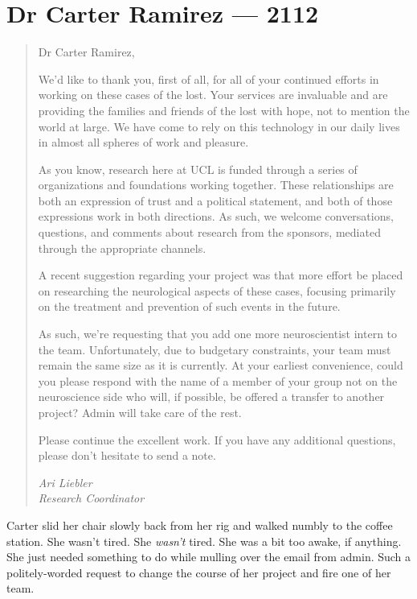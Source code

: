\hypertarget{dr-carter-ramirez-2112}{%
\chapter*{Dr Carter Ramirez — 2112}\label{dr-carter-ramirez-2112}}

\begin{quote}
Dr Carter Ramirez,

We'd like to thank you, first of all, for all of your continued efforts in working on these cases of the lost. Your services are invaluable and are providing the families and friends of the lost with hope, not to mention the world at large. We have come to rely on this technology in our daily lives in almost all spheres of work and pleasure.

As you know, research here at UCL is funded through a series of organizations and foundations working together. These relationships are both an expression of trust and a political statement, and both of those expressions work in both directions. As such, we welcome conversations, questions, and comments about research from the sponsors, mediated through the appropriate channels.

A recent suggestion regarding your project was that more effort be placed on researching the neurological aspects of these cases, focusing primarily on the treatment and prevention of such events in the future.

As such, we're requesting that you add one more neuroscientist intern to the team. Unfortunately, due to budgetary constraints, your team must remain the same size as it is currently. At your earliest convenience, could you please respond with the name of a member of your group not on the neuroscience side who will, if possible, be offered a transfer to another project? Admin will take care of the rest.

Please continue the excellent work. If you have any additional questions, please don't hesitate to send a note.

\emph{Ari Liebler}\\
\emph{Research Coordinator}
\end{quote}

Carter slid her chair slowly back from her rig and walked numbly to the coffee station. She wasn't tired. She \emph{wasn't} tired. She was a bit too awake, if anything. She just needed something to do while mulling over the email from admin. Such a politely-worded request to change the course of her project and fire one of her team.

